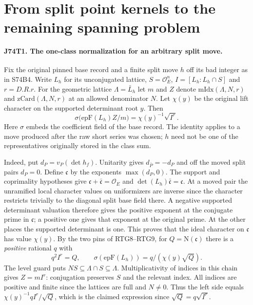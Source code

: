 \section{From split point kernels to the remaining spanning problem}

\paragraph{J74T1. The one-class normalization for an arbitrary split move.}
Fix the original pinned base record and a finite split move $h$ off its
bad integer as in S74B4. Write $L_h$ for its unconjugated lattice,
$S=\mathcal O_E^n$, $I=[L_h:L_h\cap S]$ and $r=D.R.r$.
For the geometric lattice $\Lambda=\bar L_h$ let $m$ and $Z$
denote $\mathrm{mIdx}(\Lambda,N,r)$ and
$\mathrm{zCard}(\Lambda,N,r)$ at an allowed denominator $N$.
Let $\chi(y)$ be the original lift character on the supported
determinant root $y$. Then
\[
        \sigma\bigl(\mathrm{epF}(L_h)Z/m\bigr)
                       =\chi(y)^{-1}\sqrt{I^r}.
\]
Here $\sigma$ embeds the coefficient field of the base record. The
identity applies to a move produced after the raw short series was
chosen; $h$ need not be one of the representatives originally stored
in the class sum.

Indeed, put $d_P=v_P(\det h_f)$. Unitarity gives
$d_{\bar P}=-d_P$ and off the moved split pairs $d_P=0$. Define
$\mathfrak c$ by the exponents $\max(d_P,0)$. The support and
coprimality hypotheses give
$\mathfrak c+\bar{\mathfrak c}=\mathcal O_E$ and
$\det(L_h)\bar{\mathfrak c}=\mathfrak c$. At a moved pair the
unramified local character values on uniformizers are inverse since
the character restricts trivially to the diagonal split base field
there. A negative supported determinant valuation therefore gives the
positive exponent at the conjugate prime in $\mathfrak c$; a positive
one gives that exponent at the original prime. At the other places
the supported determinant is one. This proves that the ideal character
on $\mathfrak c$ has value $\chi(y)$. By the two pins of RTG8--RTG9,
for $Q=\mathrm N(\mathfrak c)$ there is a \emph{positive} rational
$q$ with
\[
 q^2 I^r=Q,\qquad
 \sigma(\mathrm{epF}(L_h))=q/(\chi(y)\sqrt Q).
\]
The level guard puts $NS\subseteq\Lambda\cap S\subseteq\Lambda$.
Multiplicativity of indices in this chain gives $Z=mI^r$:
conjugation preserves $S$ and the relevant index. All indices are
positive and finite since the lattices are full and $N\ne0$.
Thus the left side equals $\chi(y)^{-1}q I^r/\sqrt Q$,
which is the claimed expression since $\sqrt Q=q\sqrt{I^r}$.


